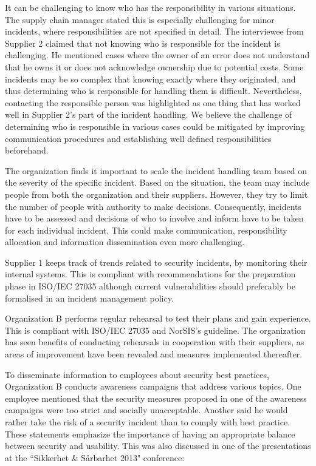 It can be challenging to know who has the responsibility in various situations. The supply chain manager stated this is especially challenging for minor incidents, where responsibilities are not specified in detail. The interviewee from Supplier 2 claimed that not knowing who is responsible for the incident is challenging. He mentioned cases where the owner of an error does not understand that he owns it or does not acknowledge ownership due to potential costs. Some incidents may be so complex that knowing exactly where they originated, and thus determining who is responsible for handling them is difficult. Nevertheless, contacting the responsible person was highlighted as one thing that has worked well in Supplier 2's part of the incident handling. We believe the challenge of determining who is responsible in various cases could be mitigated by improving communication procedures and establishing well defined responsibilities beforehand.

The organization finds it important to scale the incident handling team based on the severity of the specific incident. Based on the situation, the team may include people from both the organization and their suppliers. However, they try to limit the number of people with authority to make decisions. Consequently, incidents have to be assessed and decisions of who to involve and inform have to be taken for each individual incident. This could make communication, responsibility allocation and information dissemination even more challenging. 

Supplier 1 keeps track of trends related to security incidents, by monitoring their internal systems. This is compliant with recommendations for the preparation phase in ISO/IEC 27035 although current vulnerabilities should preferably be formalised in an incident management policy. 

Organization B performs regular rehearsal to test their plans and gain experience. This is compliant with ISO/IEC 27035 and NorSIS's guideline. The organization has seen benefits of conducting rehearsals in cooperation with their suppliers, as areas of improvement have been revealed and measures implemented thereafter.   

To disseminate information to employees about security best practices, Organization B conducts awareness campaigns that address various topics. One employee mentioned that the security measures proposed in one of the awareness campaigns were too strict and socially unacceptable. Another said he would rather take the risk of a security incident than to comply with best practice. These statements emphasize the importance of having an appropriate balance between security and usability. This was also discussed in one of the presentations at the ``Sikkerhet \& S\aa rbarhet 2013" conference:

